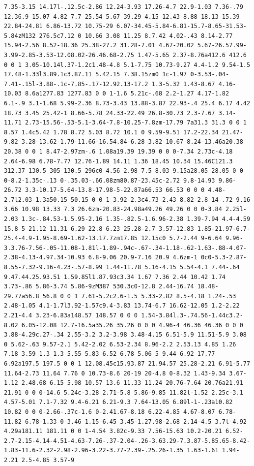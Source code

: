 \documentclass[11pt]{article}
\begin{document}
\begin{enumerate}
\begin{verbatim}
7.35-3.15 14.17l-.12.5c-2.86 12.24-3.93 17.26-4.7 22.9-1.03 7.36-.79 12.36.9 15.07 4.82 7.7 25.54 5.67 39.29-4.15 12.43-8.88 18.13-15.39 22.84-24.81 6.86-13.72 10.75-29 6.07-34.45-5.84-6.81-15.7-8.65-31.53-5.84zM132 276.5c7.12 0 10.66 3.08 11.25 8.7.42 4.02-.43 8.14-2.77 15.94-2.56 8.52-18.36 25.38-27.2 31.28-7.01 4.67-20.02 5.67-26.57.99-3.99-2.85-3.53-12.08.02-26.46.68-2.75 1.47-5.65 2.37-8.76a412.6 412.6 0 0 1 3.05-10.14l.37-1.2c1.48-4.8 5.1-7.75 10.73-9.27 4.4-1.2 9.54-1.5 17.48-1.33l3.89.1c3.87.11 5.42.15 7.38.15zm0 1c-1.97 0-3.53-.04-7.41-.15l-3.88-.1c-7.85-.17-12.92.13-17.2 1.3-5.32 1.43-8.67 4.16-10.03 8.6a1277.83 1277.83 0 0 1-1.6 5.21c-.68 2.2-1.27 4.17-1.82 6.1-.9 3.1-1.68 5.99-2.36 8.73-3.43 13.88-3.87 22.93-.4 25.4 6.17 4.42 18.73 3.45 25.42-1 8.66-5.78 24.33-22.49 26.8-30.73 2.3-7.67 3.14-11.71 2.73-15.56-.53-5.1-3.64-7.8-10.25-7.8zm-17.79 7a31.3 31.3 0 0 1 8.57 1.4c5.42 1.78 8.72 5.03 8.72 10.1 0 9.59-9.51 17.2-22.34 21.47-9.82 3.28-13.62-1.79-11.66-16.54.84-6.28 3.82-10.67 8.24-13.46a20.38 20.38 0 0 1 8.47-2.97zm-.6 1.08a19.39 19.39 0 0 0-7.34 2.73c-4.18 2.64-6.98 6.78-7.77 12.76-1.89 14.11 1.36 18.45 10.34 15.46C121.3 312.37 130.5 305 130.5 296c0-4.56-2.98-7.5-8.03-9.15a28.05 28.05 0 0 0-8.2-1.35c-.13 0-.35.03-.66.08zm80.87-23.45c-2.72 9.8-14.93 9.86-26.72 3.3-10.17-5.64-13.8-17.98-5-22.87a66.53 66.53 0 0 0 4.48-2.7l2.03-1.3a50.15 50.15 0 0 1 3.92-2.3c4.73-2.43 8.82-2.8 14-.72 9.16 3.66 10.98 13.33 7.3 26.6zm-20.83-24.98a49.26 49.26 0 0 0-3.84 2.25l-2.03 1.3c-.84.53-1.5.95-2.16 1.35-.82.5-1.6.96-2.38 1.39-7.94 4.4-4.59 15.8 5 21.12 11.31 6.29 22.8 6.23 25.28-2.7 3.57-12.83 1.85-21.97-6.7-25.4-4.9-1.95-8.69-1.62-13.17.7zm17.85 12.15c0 5.7-2.44 9-6.64 9.96-3.3.76-7.56-.05-11.08-1.81l-1.89-.94c-.67-.34-1.18-.62-1.63-.88-4.07-2.38-4.13-4.97.34-10.93 6.8-9.06 20.9-7.16 20.9 4.6zm-1 0c0-5.3-2.87-8.55-7.32-9.16-4.23-.57-8.99 1.44-11.78 5.16-4.15 5.54-4.1 7.44-.64 9.47.44.25.93.51 1.59.85l1.87.93c3.34 1.67 7.36 2.44 10.42 1.74 3.73-.86 5.86-3.74 5.86-9zM387 530.3c0-12.8 2.44-16.74 18.48-29.77a56.8 56.8 0 0 1 7.61-5.2c2.6-1.5 5.33-2.82 8.5-4.18 1.24-.53 2.48-1.05 4.1-1.7l3.92-1.57c9.4-3.83 13.74-6.7 16.62-12.05 1.2-2.22 2.21-4.4 3.23-6.83a148.57 148.57 0 0 0 1.54-3.84l.3-.74.56-1.44c3.2-8.02 6.05-12.08 12.7-16.5a35.26 35.26 0 0 0 4.96-4 46.36 46.36 0 0 0 3.88-4.29c.27-.34 2.55-3.2 3.2-3.98 3.48-4.15 6.51-5.9 11.51-5.9 3.08 0 5.62-.63 9.57-2.1 5.42-2.02 6.53-2.34 8.96-2.2 2.53.13 4.85 1.26 7.18 3.59 1.3 1.3 5.55 5.83 6.52 6.78 5.06 5 9.44 6.92 17.77 6.92a197.5 197.5 0 0 1 12.08.45c15.93.87 21.94.57 25.28-2.21 6.91-5.77 11.64-2.73 11.64 7.76 0 10.73-8.6 20-19 20-4.8 0-8.32 1.43-9.34 3.67-1.12 2.48.68 6.15 5.98 10.57 13.6 11.33 11.24 20.76-7.64 20.76a21.91 21.91 0 0 0-14.6 5.24c-3.28 2.71-5.8 5.86-9.85 11.82l-1.52 2.25c-3.1 4.57-5.01 7.1-7.32 9.4-6.21 6.21-9.3 7.64-13.05 6.89l-1-.23a10.82 10.82 0 0 0-2.66-.37c-1.6 0-2.41.67-8.18 6.22-4.85 4.67-8.07 6.78-11.82 6.78-1.33 0-3.46 1.15-6.45 3.45-1.27.98-2.68 2.14-4.5 3.7l-4.92 4.29a181.11 181.11 0 0 1-4.54 3.82c-9.33 7.56-15.63 10.2-20.21 6.52-2.7-2.15-4.14-4.51-4.63-7.26-.37-2.04-.26-3.63.29-7.3.87-5.85.65-8.42-1.83-11.6-2.32-2.98-2.96-3.22-3.77-2.39-.25.26-1.35 1.63-1.61 1.94-2.21 2.5-4.85 3.57-9 
\end{verbatim}
\end{enumerate}
\end{document}

